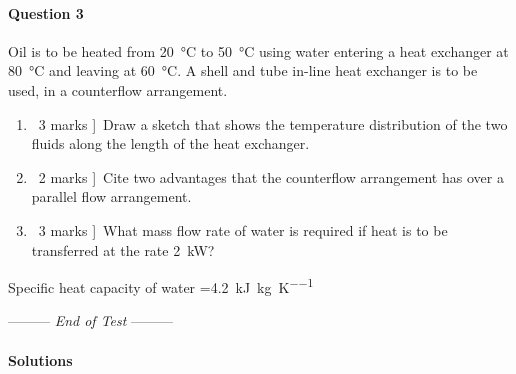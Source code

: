 \documentclass[a4paper,12pt,fleqn]{article}
\newcommand{\lastwords}{End of Test}
\begin{document}
\paragraph{\textbf{Question 3} \ }
Oil is to be heated from \SI{20}{\celsius} to \SI{50}{\celsius} using water entering a heat exchanger at \SI{80}{\celsius} and leaving at \SI{60}{\celsius}. A shell and tube in-line heat exchanger is to be used, in a counterflow arrangement. 
\begin{enumerate}[label=\alph*)]
\item \lbrack\ 3 marks ]\ Draw a sketch that shows the temperature distribution of the two fluids along the length of the heat exchanger.
\item \lbrack\ 2 marks ]\ Cite two advantages that the counterflow arrangement has over a parallel flow arrangement.
\item \lbrack\ 3 marks ]\ What mass flow rate of water is required if heat is to be transferred at the rate \SI{2}{\kilo\watt}?
\end{enumerate}
Specific heat capacity of water =\SI{4.2}{\kilo\joule\per\kg\per\kelvin}



\begin{center}
\vspace{3cm}
--------- \textit{\lastwords} ---------
\end{center}


\label{finalpage}


\newpage
\paragraph{\textbf{Solutions} \ }
\end{document}
